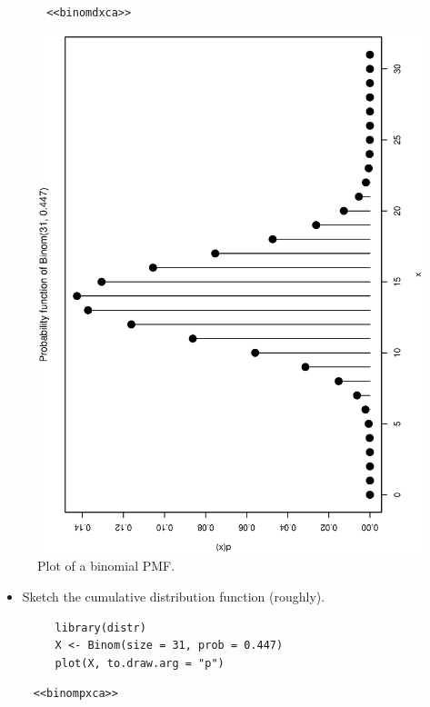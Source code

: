 \documentclass[captions=tableheading]{scrbook}
\begin{document}
\begin{xca}
\begin{verbatim}
       <<binomdxca>>
\end{verbatim}
     \begin{figure}[th]
       \includegraphics[angle=270, totalheight=4in]{ps/binomdxca.ps}
       \caption[Plot of a binomial PMF]{\small Plot of a binomial PMF.}
       \label{fig:binomdxca}
     \end{figure}
\begin{itemize}
\item Sketch the cumulative distribution function (roughly).

\begin{verbatim}
     library(distr)
     X <- Binom(size = 31, prob = 0.447)
     plot(X, to.draw.arg = "p")
\end{verbatim}
\end{itemize}

\begin{verbatim}
     <<binompxca>>
\end{verbatim}


\end{xca}
\end{document}
